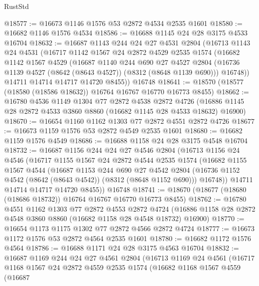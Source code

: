\begin{lexlean}{RustStd}
\begin{coremodule}
@18577 := @16673 @1146 @1576 @53 @2872 @4534 @2535 @1601
@18580 := @16682 @1146 @1576 @4534
@18586 := @16688 @1145 @24 @28 @3175 @4533 @16704
@18632 := @16687
    @1143
    @244
    @24
    @27
    @4531
    @2804
    (@16713
      @1143
      @24
      @4531
      (@16717
        @1142
        @1567
        @24
        @2872
        @4529
        @2535
        @1574
        (@16682
          @1142
          @1567
          @4529
          (@16687
            @1140
            @244
            @690
            @27
            @4527
            @2804
            (@16736 @1139 @4527 (@8642 (@8643 @4527)) (@8312 (@8648 @1139 @690)))
            @16748))
        @14711
        @14714
        @14717
        @14720
        @8455))
    @16748
@18641 := @18570 (@18577 (@18580 (@18586 @18632)) @16764 @16767 @16770 @16773 @8455)
@18662 := @16780
    @4536
    @1149
    @1304
    @77
    @2872
    @4538
    @2872
    @4726
    (@16886 @1145 @28 @2872 @4533 @3860 @8860 (@16682 @1145 @28 @4533 @18632) @16900)
@18670 := @16654 @1160 @1162 @1303 @77 @2872 @4551 @2872 @4726
@18677 := @16673 @1159 @1576 @53 @2872 @4549 @2535 @1601
@18680 := @16682 @1159 @1576 @4549
@18686 := @16688 @1158 @24 @28 @3175 @4548 @16704
@18732 := @16687
    @1156
    @244
    @24
    @27
    @4546
    @2804
    (@16713
      @1156
      @24
      @4546
      (@16717
        @1155
        @1567
        @24
        @2872
        @4544
        @2535
        @1574
        (@16682
          @1155
          @1567
          @4544
          (@16687
            @1153
            @244
            @690
            @27
            @4542
            @2804
            (@16736 @1152 @4542 (@8642 (@8643 @4542)) (@8312 (@8648 @1152 @690)))
            @16748))
        @14711
        @14714
        @14717
        @14720
        @8455))
    @16748
@18741 := @18670 (@18677 (@18680 (@18686 @18732)) @16764 @16767 @16770 @16773 @8455)
@18762 := @16780
    @4551
    @1162
    @1303
    @77
    @2872
    @4553
    @2872
    @4724
    (@16886 @1158 @28 @2872 @4548 @3860 @8860 (@16682 @1158 @28 @4548 @18732) @16900)
@18770 := @16654 @1173 @1175 @1302 @77 @2872 @4566 @2872 @4724
@18777 := @16673 @1172 @1576 @53 @2872 @4564 @2535 @1601
@18780 := @16682 @1172 @1576 @4564
@18786 := @16688 @1171 @24 @28 @3175 @4563 @16704
@18832 := @16687
    @1169
    @244
    @24
    @27
    @4561
    @2804
    (@16713
      @1169
      @24
      @4561
      (@16717
        @1168
        @1567
        @24
        @2872
        @4559
        @2535
        @1574
        (@16682
          @1168
          @1567
          @4559
          (@16687

\end{coremodule}
\end{lexlean}

